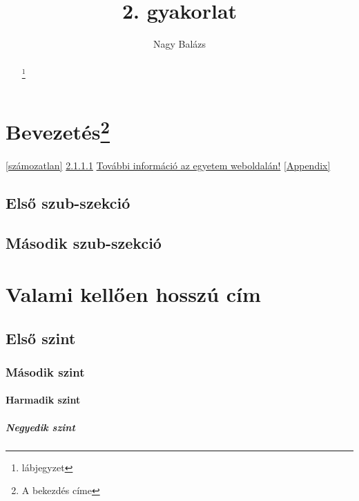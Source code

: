 \documentclass[12pt, twoside]{article}
\author{Nagy Balázs}
\title{2. gyakorlat}
\begin{document}
\setcounter{secnumdepth}{5}
\setcounter{tocdepth}{5}
\pagestyle{plain}
\maketitle
\pagestyle{fancy}

\begin{abstract}
\hulipsum[4]
\footnote[5]{lábjegyzet}
\end{abstract}
\clearpage

\tableofcontents
{}

\clearpage

\section[Prologue]{Bevezetés\footnote[4]{A bekezdés címe}}
\ref{számozatlan}\linebreak
\ref{2nd section}\linebreak
\pageref{Két szekció között}\linebreak
\pageref{Appendix}\linebreak
\href{https://www.youtube.com/watch?v=dQw4w9WgXcQ}{További információ az egyetem weboldalán!}\linebreak
\autoref{Appendix}
\subsection{Első szub-szekció}
\hulipsum[4]

\subsection{Második szub-szekció}
\marginpar{\hulipsum[1]}
\hulipsum[13]

\label{Két szekció között}

\section{Valami kellően hosszú cím}
\subsection{Első szint}
\subsubsection{Második szint}
\paragraph{Harmadik szint}
\label{2nd section}
\subparagraph{Negyedik szint}
\end{document}
